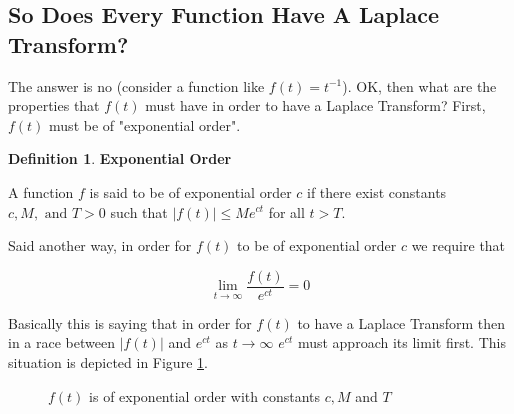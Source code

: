 \documentclass{article}
\theoremstyle{definition}
\newtheorem{definition}{Definition}[section]
\begin{document}
\bigskip
\subsection{So Does Every Function Have A Laplace Transform?}
The answer is no (consider a function like $f(t) = t^{-1}$). OK, then what are the properties that $f(t)$ must have in order to have a Laplace Transform? First, $f(t)$ must
be of "exponential order". 


\bigskip
\begin{definition} 
{\bf Exponential Order}
\label{def:exponential_order}
\end{definition}
\noindent
A function $f$ is said to be of exponential order $c$ if there exist constants $c, M, \text{ and } T > 0$ such that $|f(t)| \leq Me^{ct}$ for all $t > T$.

\bigskip
\noindent
Said another way, in order for $f(t)$ to be of exponential order $c$ we require that  

\bigskip
\begin{equation*}
\lim\limits_{t \to \infty} \frac{f(t)}{e^{ct}} = 0
\end{equation*}

\medskip
\bigskip
\noindent
Basically this is saying that in order for $f(t)$ to have a Laplace Transform then in a race between $|f(t)|$ and $e^{ct}$ as $t \to \infty$ $e^{ct}$ must
approach its limit first. This situation is depicted in Figure \ref{fig:exponential_order}.

\smallskip
\bigskip
\begin{figure}[H]
\caption{$f(t)$ is of exponential order with constants $c, M$ and $T$}
\label{fig:exponential_order}
\end{figure}
\end{document}
